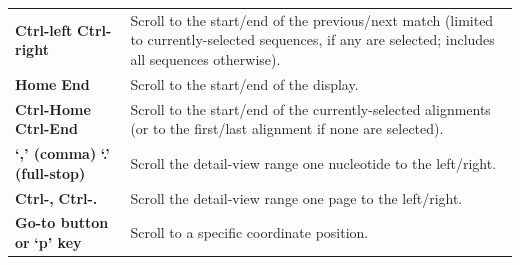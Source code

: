 \documentclass[letterpaper]{article}
\begin{document}
\begin{flushleft}
\begin{supertabular}{p{4.15cm}p{10.436cm}}
{\bfseries Ctrl-left}
{\bfseries Ctrl-right}
 &
{ Scroll to the start/end of the previous/next
match (limited to currently-selected sequences, if any are selected;
includes all sequences otherwise).}
\\

{\bfseries Home}
{\bfseries End}
 &
 Scroll to the start/end of the display.
\\

{\bfseries Ctrl-Home}
{\bfseries Ctrl-End}
 &
{ Scroll to the start/end of the
currently-selected alignments (or to the first/last alignment if none
are selected).}
\\

{\bfseries {\textquoteleft},{\textquoteright}
(comma)}
{\bfseries {\textquoteleft}.{\textquoteright}
(full-stop)}
 &
 Scroll the detail-view range one nucleotide to
the left/right.
\\

{\bfseries Ctrl-,}
{\bfseries Ctrl-.}
 &
 Scroll the detail-view range one page to the
left/right.
\\

{\bfseries Go-to button or}
\bfseries {\textquoteleft}p{\textquoteright} key
&
 Scroll to a specific coordinate position.
\\

\end{supertabular}
\end{flushleft}
\end{document}
